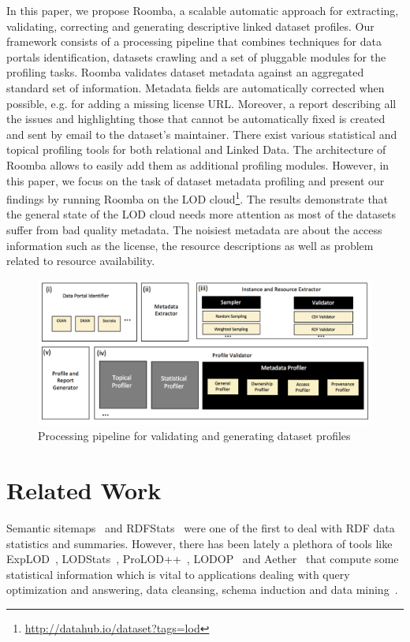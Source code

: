 \documentclass{../../Tools/LaTEX/sig-alternate}
\begin{document}
In this paper, we propose Roomba, a scalable automatic approach for extracting, validating, correcting and generating descriptive linked dataset profiles. Our framework consists of a processing pipeline that combines techniques for data portals identification, datasets crawling and a set of pluggable modules for the profiling tasks. Roomba validates dataset metadata against an aggregated standard set of information. Metadata fields are automatically corrected when possible, e.g. for adding a missing license URL. Moreover, a report describing all the issues and highlighting those that cannot be automatically fixed is created and sent by email to the dataset's maintainer. There exist various statistical and topical profiling tools for both relational and Linked Data. The architecture of Roomba allows to easily add them as additional profiling modules. However, in this paper, we focus on the task of dataset metadata profiling and present our findings by running Roomba on the LOD cloud\footnote{\url{http://datahub.io/dataset?tags=lod}}. The results demonstrate that the general state of the LOD cloud needs more attention as most of the datasets suffer from bad quality metadata. The noisiest metadata are about the access information such as the license, the resource descriptions as well as problem related to resource availability.

\begin{figure}[!htbp]
  \centering
  \includegraphics[scale=0.39]{figure-1_architecture.png}
  \caption{Processing pipeline for validating and generating dataset profiles}
  \label{fig:Roomba_architecture}
\end{figure}


\section{Related Work}
\label{sec:related-work}
Semantic sitemaps~\cite{Cyganiak:ESWC:08} and RDFStats~\cite{Lanegger:DEXA:09} were one of the first to deal with RDF data statistics and summaries. However, there has been lately a plethora of tools like ExpLOD~\cite{Khatchadourian:ESWC:10}, LODStats~\cite{Auer:EKAW:12}, ProLOD++~\cite{Abedjan:ICDE:14}, LODOP~\cite{Forchhammer:PROFILES:14} and Aether~\cite{Makela:ESWC:14} that compute some statistical information which is vital to applications dealing with query optimization and answering, data cleansing, schema induction and data mining~\cite{Jentzsch:ISWC:14,Lalithsena:WI:13}.
\end{document}
